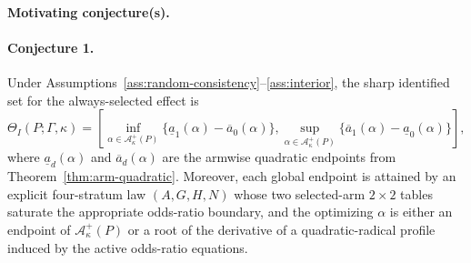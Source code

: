 \documentclass[11pt]{article}
\theoremstyle{definition}
\theoremstyle{plain}
\theoremstyle{remark}
\begin{document}
\paragraph{Motivating conjecture(s).}
\paragraph{Conjecture 1.}
\label{conj:lee-gamma-frontier}
Under Assumptions~\ref{ass:random-consistency}--\ref{ass:interior}, the sharp identified set for the always-selected effect is
\[
  \Theta_I(P;\Gamma,\kappa)=
  \left[
    \inf_{\alpha\in\mathcal A_\kappa^+(P)}
      \{\underline a_1(\alpha)-\overline a_0(\alpha)\},
    \sup_{\alpha\in\mathcal A_\kappa^+(P)}
      \{\overline a_1(\alpha)-\underline a_0(\alpha)\}
  \right],
\]
where \(\underline a_d(\alpha)\) and \(\overline a_d(\alpha)\) are the armwise quadratic endpoints from Theorem~\ref{thm:arm-quadratic}.  Moreover, each global endpoint is attained by an explicit four-stratum law \((A,G,H,N)\) whose two selected-arm \(2\times2\) tables saturate the appropriate odds-ratio boundary, and the optimizing \(\alpha\) is either an endpoint of \(\mathcal A_\kappa^+(P)\) or a root of the derivative of a quadratic-radical profile induced by the active odds-ratio equations.
\end{document}
